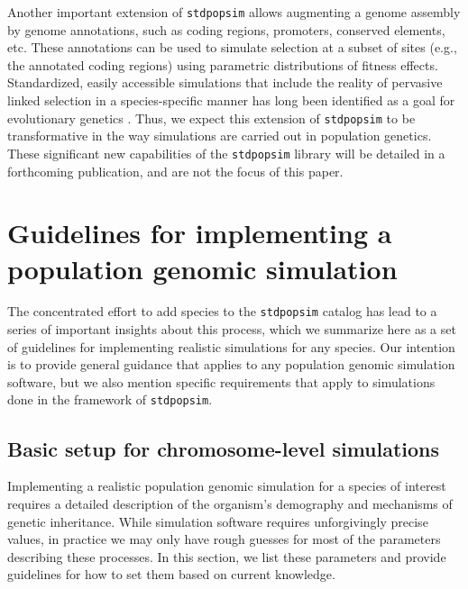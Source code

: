 \documentclass[hidelinks]{article}
\makeatletter
\newcommand{\stdpopsim}{\texttt{stdpopsim}\xspace}
\newcommand{\labelname}[1]{\def\@currentlabelname{#1}}
\makeatother
\begin{document}
Another important extension of \stdpopsim allows augmenting a genome assembly by genome annotations, such as coding regions, promoters, conserved elements, etc.
These annotations can be used to simulate selection at a subset of sites (e.g., the annotated coding regions)
using parametric distributions of fitness effects.
Standardized, easily accessible simulations
that include the reality of pervasive linked selection in a species-specific
manner has long been identified as a goal for evolutionary genetics
\cite[e.g.,][]{McVicker2009,comeron2014background}.
Thus, we expect this extension of \stdpopsim to be transformative in the way simulations are carried out in population genetics.
These significant new capabilities of the \stdpopsim library will be detailed in a forthcoming publication,
and are not the focus of this paper.

\section*{Guidelines for implementing a population genomic simulation}
    \labelname{Guidelines}
    \label{sec:sim-guidelines}


The concentrated effort to add species to the \stdpopsim catalog
has lead to a series of important insights about this process,
which we summarize here as a set of guidelines
for implementing realistic simulations for any species.
Our intention is to provide general guidance that applies to any population genomic simulation software,
but we also mention specific requirements that apply to simulations done in the framework of \stdpopsim.

\subsection*{Basic setup for chromosome-level simulations}

Implementing a realistic population genomic simulation for a species of interest
requires a detailed description of the organism's demography and mechanisms of genetic inheritance.
While simulation software requires unforgivingly precise values,
in practice we may only have rough guesses for most of the parameters describing these processes.
In this section, we list these parameters and
provide guidelines for how to set them based on current knowledge.
\end{document}
